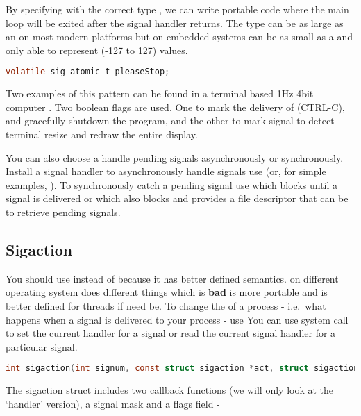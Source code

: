 By specifying  with the correct type , we can write portable code where the main loop will be exited after the signal handler returns. The  type can be as large as an  on most modern platforms but on embedded systems can be as small as a  and only able to represent (-127 to 127) values.

\begin{lstlisting}[language=C]
volatile sig_atomic_t pleaseStop;
\end{lstlisting}

Two examples of this pattern can be found in  a terminal based 1Hz 4bit computer \cite{Sorn_2015}. Two boolean flags are used. One to mark the delivery of  (CTRL-C), and gracefully shutdown the program, and the other to mark  signal to detect terminal resize and redraw the entire display.

You can also choose a handle pending signals asynchronously or synchronously. Install a signal handler to asynchronously handle signals use  (or, for simple examples,  ). To synchronously catch a pending signal use  which blocks until a signal is delivered or  which also blocks and provides a file descriptor that can be  to retrieve pending signals.

\subsection{Sigaction}

You should use  instead of  because it has better defined semantics.  on different operating system does different things which is \textbf{bad}  is more portable and is better defined for threads if need be. To change the  of a process - i.e.~what happens when a signal is delivered to your process - use  You can use system call  to set the current handler for a signal or read the current signal handler for a particular signal.

\begin{lstlisting}[language=C]
int sigaction(int signum, const struct sigaction *act, struct sigaction *oldact);
\end{lstlisting}

The sigaction struct includes two callback functions (we will only look at the `handler' version), a signal mask and a flags field -

